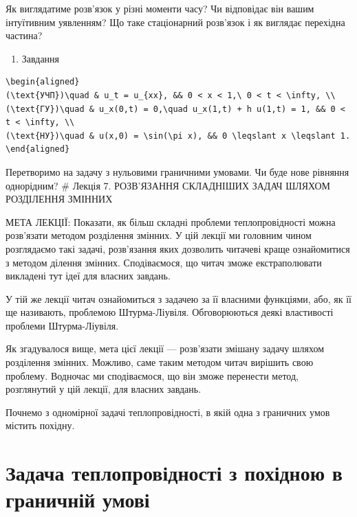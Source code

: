 \documentclass[
  ukrainian,
]{article}
\providecommand{\tightlist}{%
  \setlength{\itemsep}{0pt}\setlength{\parskip}{0pt}}
\begin{document}
Як виглядатиме розв'язок у різні моменти часу? Чи відповідає він вашим
інтуїтивним уявленням? Що таке стаціонарний розв'язок і як виглядає
перехідна частина?

\begin{enumerate}
\def\labelenumi{\arabic{enumi}.}
\setcounter{enumi}{2}
\tightlist
\item
  Завдання
\end{enumerate}

\begin{verbatim}
\begin{aligned}
(\text{УЧП})\quad & u_t = u_{xx}, && 0 < x < 1,\ 0 < t < \infty, \\
(\text{ГУ})\quad & u_x(0,t) = 0,\quad u_x(1,t) + h u(1,t) = 1, && 0 < t < \infty, \\
(\text{НУ})\quad & u(x,0) = \sin(\pi x), && 0 \leqslant x \leqslant 1.
\end{aligned}
\end{verbatim}

Перетворимо на задачу з нульовими граничними умовами. Чи буде нове
рівняння однорідним? \# Лекція 7. РОЗВ'ЯЗАННЯ СКЛАДНІШИХ ЗАДАЧ ШЛЯХОМ
РОЗДІЛЕННЯ ЗМІННИХ

МЕТА ЛЕКЦІЇ: Показати, як більш складні проблеми теплопровідності можна
розв'язати методом розділення змінних. У цій лекції ми головним чином
розглядаємо такі задачі, розв'язання яких дозволить читачеві краще
ознайомитися з методом ділення змінних. Сподіваємося, що читач зможе
екстраполювати викладені тут ідеї для власних завдань.

У тій же лекції читач ознайомиться з задачею за її власними функціями,
або, як її ще називають, проблемою Штурма-Ліувіля. Обговорюються деякі
властивості проблеми Штурма-Ліувіля.

Як згадувалося вище, мета цієї лекції --- розв'язати змішану задачу
шляхом розділення змінних. Можливо, саме таким методом читач вирішить
свою проблему. Водночас ми сподіваємося, що він зможе перенести метод,
розглянутий у цій лекції, для власних завдань.

Почнемо з одномірної задачі теплопровідності, в якій одна з граничних
умов містить похідну.

\section{Задача теплопровідності з похідною в граничній
умові}\label{ux437ux430ux434ux430ux447ux430-ux442ux435ux43fux43bux43eux43fux440ux43eux432ux456ux434ux43dux43eux441ux442ux456-ux437-ux43fux43eux445ux456ux434ux43dux43eux44e-ux432-ux433ux440ux430ux43dux438ux447ux43dux456ux439-ux443ux43cux43eux432ux456}
\end{document}

